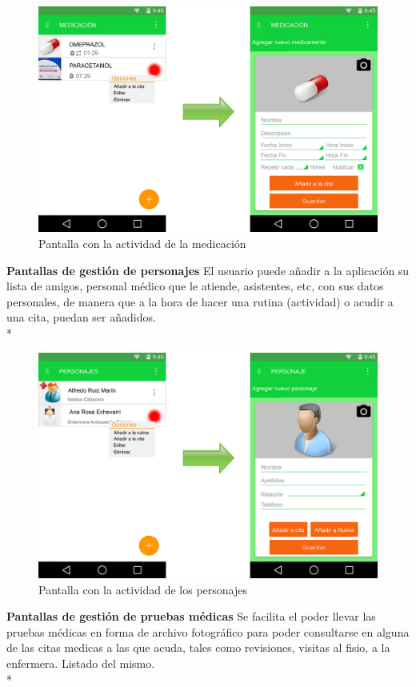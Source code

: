 \documentclass[../pfc.tex]{subfiles}
\begin{document}
			\begin{figure}[h]
				\centering
				\includegraphics[width=0.7\linewidth]{../images/medicacion}
				\caption{Pantalla con la actividad de la medicación}
				\label{fig:medicacion}
			\end{figure}
			
			
			\textbf{Pantallas de gestión de personajes}
			El usuario puede añadir a la aplicación su lista de amigos, personal médico que le atiende, asistentes, etc, con sus datos personales, de manera que a la hora de hacer una rutina (actividad) o acudir a una cita, puedan ser añadidos.\\*
			
			
			\begin{figure}[h]
				\centering
				\includegraphics[width=0.7\linewidth]{../images/personajes}
				\caption{Pantalla con la actividad de los personajes}
				\label{fig:personajes}
			\end{figure}
			
			
			\textbf{Pantallas de gestión de pruebas médicas}
			Se facilita el poder llevar las pruebas médicas en forma de archivo fotográfico para poder consultarse en alguna de las citas medicas a las que acuda, tales como revisiones, visitas al fisio, a la enfermera. Listado del mismo.\\*
			
\end{document}
